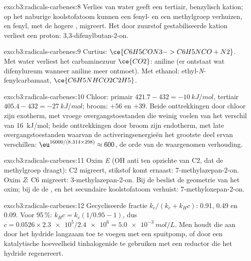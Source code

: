 \begin{solution}{exo:b3:radicals-carbenes:8}
Verlies van water geeft een tertiair, benzylisch kation; op het naburige
koolstofatoom kunnen een fenyl- en een methylgroep verhuizen, en fenyl,
met de hogere , migreert. Het door zuurstof
gestabiliseerde kation verliest een proton: 3,3-difenylbutan-2-on.
\end{solution}

\begin{solution}{exo:b3:radicals-carbenes:9}
Curtius: $\ce{C6H5CON3 -> C6H5NCO + N2}$. Met water verliest het carbaminezuur $\ce{CO2}$: aniline
(er ontstaat wat difenylureum wanneer aniline meer  ontmoet). Met
ethanol: ethyl-\textit{N}-fenylcarbamaat, $\ce{C6H5NHCO2C2H5}$.
\end{solution}

\begin{solution}{exo:b3:radicals-carbenes:10}
Chloor: primair $421.7 - 432 = \qty{-10}{kJ/mol}$, tertiair $405.4 - 432 = \qty{-27}{kJ/mol}$; broom: $+56$ en
$+39$. Beide onttrekkingen door chloor zijn exotherm, met vroege
overgangstoestanden die weinig voelen van het verschil van
\qty{16}{kJ/mol}; beide onttrekkingen door broom zijn endotherm, met late
overgangstoestanden waarvan de activeringsenergieën het grootste deel
ervan verschillen:
$\eu^{16000/(8.314 \times 298)} \approx 600$, de orde van de waargenomen verhouding.
\end{solution}

\begin{solution}{exo:b3:radicals-carbenes:11}
Oxim \textit{E} (OH anti ten opzichte van C2, dat de methylgroep draagt): C2 migreert, stikstof komt
ernaast: 7-methylazepan-2-on. Oxim \textit{Z}: C6 migreert: 3-methylazepan-2-on. Bij de
 beslist de geometrie van het oxim; bij de
 de , en het secundaire
koolstofatoom verhuist:
7-methyloxepan-2-on.
\end{solution}

\begin{solution}{exo:b3:radicals-carbenes:12}
Gecycliseerde fractie $k_c/(k_c + k_H c)$: 0.91, 0.49 en 0.09. Voor 95\,\%: $k_Hc = k_c(1/0.95 - 1)$, dus
$c = 0.0526 \times \num{2.3e5}/\num{2.4e6} = \qty{5.0e-3}{mol/L}$. Men houdt die aan door het hydride langzaam toe te
voegen met een spuitpomp, of door een katalytische hoeveelheid
tinhalogenide te gebruiken met een reductor die het hydride regenereert.
\end{solution}

